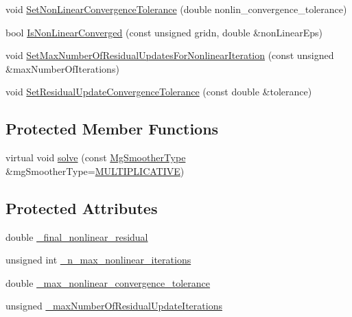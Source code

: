 \begin{DoxyCompactItemize}
void \mbox{\hyperlink{classfemus_1_1_non_linear_implicit_system_aa9f91520a1b8e47092045a3ed052c89d}{Set\+Non\+Linear\+Convergence\+Tolerance}} (double nonlin\+\_\+convergence\+\_\+tolerance)
\item 
bool \mbox{\hyperlink{classfemus_1_1_non_linear_implicit_system_a1bd16b7e0fafb9b06ea7d529fd0b0f7b}{Is\+Non\+Linear\+Converged}} (const unsigned gridn, double \&non\+Linear\+Eps)
\item 
void \mbox{\hyperlink{classfemus_1_1_non_linear_implicit_system_ac1129633fc64e3ebfa575ab823a764f4}{Set\+Max\+Number\+Of\+Residual\+Updates\+For\+Nonlinear\+Iteration}} (const unsigned \&max\+Number\+Of\+Iterations)
\item 
void \mbox{\hyperlink{classfemus_1_1_non_linear_implicit_system_aa5745cfd7f2f0c9013e1aec7324c6ec7}{Set\+Residual\+Update\+Convergence\+Tolerance}} (const double \&tolerance)
\end{DoxyCompactItemize}
\subsection*{Protected Member Functions}
\begin{DoxyCompactItemize}
\item 
virtual void \mbox{\hyperlink{classfemus_1_1_non_linear_implicit_system_a4abfe53698e95f1075194cf3a7ce790a}{solve}} (const \mbox{\hyperlink{_mg_type_enum_8hpp_aec11e12c1f11a6ad959d3280ae0ee9a8}{Mg\+Smoother\+Type}} \&mg\+Smoother\+Type=\mbox{\hyperlink{_mg_type_enum_8hpp_aec11e12c1f11a6ad959d3280ae0ee9a8a2618be531dddb3647be5874ddcae5164}{M\+U\+L\+T\+I\+P\+L\+I\+C\+A\+T\+I\+VE}})
\end{DoxyCompactItemize}
\subsection*{Protected Attributes}
\begin{DoxyCompactItemize}
\item 
double \mbox{\hyperlink{classfemus_1_1_non_linear_implicit_system_ab5c78ff5fc515d2ebe4cd3fb0c931cb0}{\+\_\+final\+\_\+nonlinear\+\_\+residual}}
\item 
unsigned int \mbox{\hyperlink{classfemus_1_1_non_linear_implicit_system_a42606b5212631b7d44f4fa82377a6a95}{\+\_\+n\+\_\+max\+\_\+nonlinear\+\_\+iterations}}
\item 
double \mbox{\hyperlink{classfemus_1_1_non_linear_implicit_system_a744388ccf68ac105d66450c3e7b80d7f}{\+\_\+max\+\_\+nonlinear\+\_\+convergence\+\_\+tolerance}}
\item 
unsigned \mbox{\hyperlink{classfemus_1_1_non_linear_implicit_system_a35c379d70c79b0f79735d6c5b0b04e2a}{\+\_\+max\+Number\+Of\+Residual\+Update\+Iterations}}
\end{DoxyCompactItemize}
